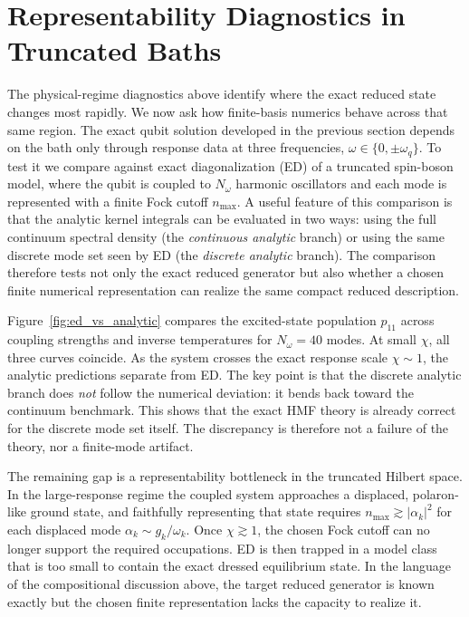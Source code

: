 \section{Representability Diagnostics in Truncated Baths}
\label{sec:numerical_results}

The physical-regime diagnostics above identify where the exact reduced state
changes most rapidly. We now ask how finite-basis numerics behave across that
same region. The exact qubit solution developed in the previous section depends
on the bath only through response data at three frequencies,
\(\omega\in\{0,\pm\omega_q\}\). To test it we
compare against exact diagonalization (ED) of a truncated spin-boson model,
where the qubit is coupled to \(N_\omega\) harmonic oscillators and each mode
is represented with a finite Fock cutoff \(n_{\max}\). A useful feature of this
comparison is that the analytic kernel integrals can be evaluated in two ways:
using the full continuum spectral density (the \emph{continuous analytic}
branch) or using the same discrete mode set seen by ED (the \emph{discrete
analytic} branch). The comparison therefore tests not only the exact reduced
generator but also whether a chosen finite numerical representation can realize
the same compact reduced description.

Figure~\ref{fig:ed_vs_analytic} compares the excited-state population
\(p_{11}\) across coupling strengths and inverse temperatures for
\(N_\omega=40\) modes. At small \(\chi\), all three curves coincide. As the
system crosses the exact response scale \(\chi\sim 1\), the analytic
predictions separate from ED. The key point is that the discrete analytic
branch does \emph{not} follow the numerical deviation: it bends back toward the
continuum benchmark. This shows that the exact HMF theory is already correct
for the discrete mode set itself. The discrepancy is therefore not a failure of
the theory, nor a finite-mode artifact.

The remaining gap is a representability bottleneck in the truncated Hilbert
space. In the large-response regime the coupled system approaches a displaced,
polaron-like ground state, and faithfully representing that state requires
\(n_{\max}\gtrsim |\alpha_k|^2\) for each displaced mode
\(\alpha_k\sim g_k/\omega_k\). Once \(\chi\gtrsim 1\), the chosen Fock cutoff
can no longer support the required occupations. ED is then trapped in a model
class that is too small to contain the exact dressed equilibrium state. In the
language of the compositional discussion above, the target reduced generator is
known exactly but the chosen finite representation lacks the capacity to
realize it.

